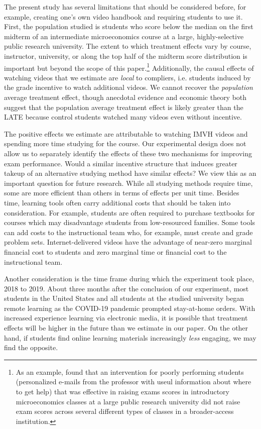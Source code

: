 \documentclass[12pt]{article}
\begin{document}
The present study has several limitations that should be considered before, for example, creating one's own video handbook and requiring students to use it. First, the population studied is students who score below the median on the first midterm of an intermediate microeconomics course at a large, highly-selective public research university. The extent to which treatment effects vary by course, instructor, university, or along the top half of the midterm score distribution is important but beyond the scope of this paper.\footnote{As an example, \textcite{ck2020} found that an intervention for poorly performing students (personalized e-mails from the professor with useul information about where to get help) that was effective in raising exams scores in introductory microeconomics classes at a large public research university did not raise exam scores across several different types of classes in a broader-access institution.} Additionally, the causal effects of watching videos that we estimate are \textit{local} to compliers, i.e. students induced by the grade incentive to watch additional videos. We cannot recover the \textit{population} average treatment effect, though anecdotal evidence and economic theory both suggest that the population average treatment effect is likely greater than the LATE because control students watched many videos even without incentive.

The positive effects we estimate are attributable to watching IMVH videos and spending more time studying for the course. Our experimental design does not allow us to separately identify the effects of these two mechanisms for improving exam performance. Would a similar incentive structure that induces greater takeup of an alternative studying method have similar effects? We view this as an important question for future research. While all studying methods require time, some are more efficient than others in terms of effects per unit time. Besides time, learning tools often carry additional costs that should be taken into consideration. For example, students are often required to purchase textbooks for courses which may disadvantage students from low-resourced families. Some tools can add costs to the instructional team who, for example, must create and grade problem sets. Internet-delivered videos have the advantage of near-zero marginal financial cost to students and zero marginal time or financial cost to the instructional team.

Another consideration is the time frame during which the experiment took place, 2018 to 2019. About three months after the conclusion of our experiment, most students in the United States and all students at the studied university began remote learning as the COVID-19 pandemic prompted stay-at-home orders. With increased experience learning via electronic media, it is possible that treatment effects will be higher in the future than we estimate in our paper. On the other hand, if students find online learning materials increasingly \textit{less} engaging, we may find the opposite.
\end{document}
